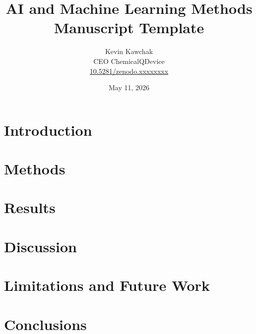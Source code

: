 \documentclass[11pt]{article}
\title{AI and Machine Learning Methods Manuscript Template}
\author{
  Kevin Kawchak\hspace{2pt}\orcidicon{0009-0007-5457-8667} \\
  CEO ChemicalQDevice\\
  \href{https://doi.org/10.5281/zenodo.xxxxxxxx}{10.5281/zenodo.xxxxxxxx} \\
}
\date{May 11, 2026}
\begin{document}
\maketitle

\begin{abstract}

\end{abstract}

\keywords{ }

\vspace{-0.2cm}

\section{Introduction}
\label{sec:introduction}


\tableofcontents
\vspace{0.4cm}

\newpage
\section{Methods}
\label{sec:methods}

\newpage

\section{Results}
\label{sec:results}

\newpage

\section{Discussion}
\label{sec:discussion}


\section{Limitations and Future Work}
\label{sec:limitations}

\newpage

\section{Conclusions}
\label{sec:conclusions}

\newpage

{}
\begingroup
\raggedright


\endgroup
\newpage


\end{document}
